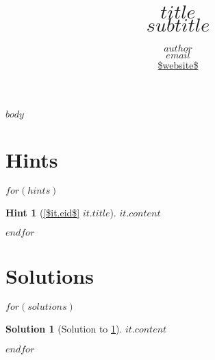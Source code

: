 \documentclass[a4,10pt]{article}
\title{{\bfseries \Huge{$title$}} \\ $subtitle$}
\author{$author$ \\ \href{mailto:$email$}{$email$} \\ \url{$website$}}
\newtheorem{hint}{Hint}
\newtheorem{solution}{Solution}
\begin{document}
\maketitle

$body$

\clearpage
\appendix

\section{Hints}

$for(hints)$
\begin{hint}[{\cref{$it.eid$} $it.title$}]
    \label{$it.id$}
    $it.content$
\end{hint}
$endfor$

\clearpage
\section{Solutions}

$for(solutions)$
\begin{solution}[Solution to \cref{$it.id$}]
    \label{$it.id$:solution}
    $it.content$
\end{solution}
$endfor$
\end{document}
